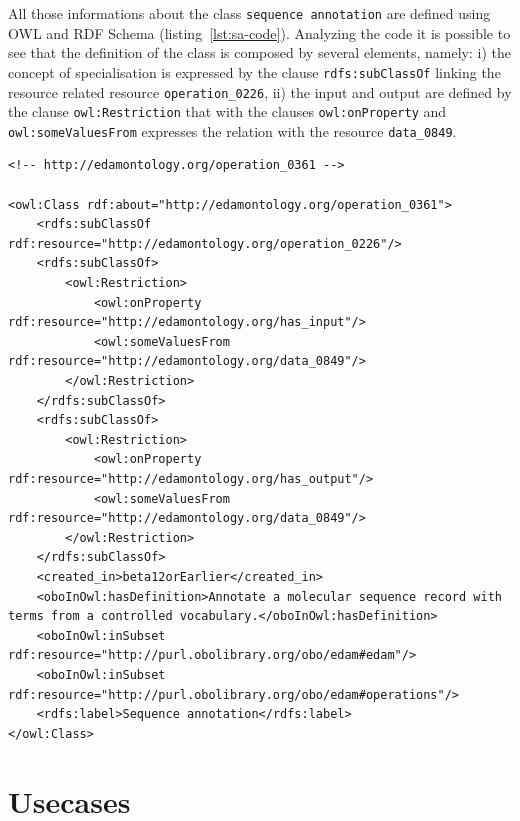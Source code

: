 \documentclass{scrartcl}
\begin{document}
All those informations about the class \texttt{sequence annotation} are defined using OWL and RDF Schema 
  (listing~\ref{lst:sa-code}). Analyzing the code it is possible to see that the definition of 
  the class is composed by several elements, namely: 
  i) the concept of specialisation is expressed by the clause \texttt{rdfs:subClassOf} 
    linking the resource related resource \texttt{operation\_0226},
  ii) the input and output are defined by the clause \texttt{owl:Restriction} 
    that with the clauses \texttt{owl:onProperty} and \texttt{owl:someValuesFrom} expresses the relation with the
    resource \texttt{data\_0849}.

% 




\begin{lstlisting}[caption={Sequence annotation operation definition}, captionpos=b, label={lst:sa-code}]
<!-- http://edamontology.org/operation_0361 -->

<owl:Class rdf:about="http://edamontology.org/operation_0361">
    <rdfs:subClassOf rdf:resource="http://edamontology.org/operation_0226"/>
    <rdfs:subClassOf>
        <owl:Restriction>
            <owl:onProperty rdf:resource="http://edamontology.org/has_input"/>
            <owl:someValuesFrom rdf:resource="http://edamontology.org/data_0849"/>
        </owl:Restriction>
    </rdfs:subClassOf>
    <rdfs:subClassOf>
        <owl:Restriction>
            <owl:onProperty rdf:resource="http://edamontology.org/has_output"/>
            <owl:someValuesFrom rdf:resource="http://edamontology.org/data_0849"/>
        </owl:Restriction>
    </rdfs:subClassOf>
    <created_in>beta12orEarlier</created_in>
    <oboInOwl:hasDefinition>Annotate a molecular sequence record with terms from a controlled vocabulary.</oboInOwl:hasDefinition>
    <oboInOwl:inSubset rdf:resource="http://purl.obolibrary.org/obo/edam#edam"/>
    <oboInOwl:inSubset rdf:resource="http://purl.obolibrary.org/obo/edam#operations"/>
    <rdfs:label>Sequence annotation</rdfs:label>
</owl:Class>
\end{lstlisting}



\newpage
\section{Usecases}
\end{document}
